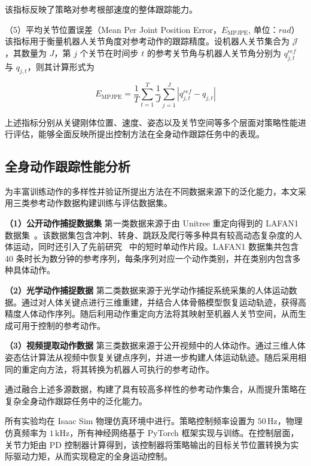 该指标反映了策略对参考根部速度的整体跟踪能力。

（5）平均关节位置误差（Mean Per Joint Position Error，$E_{\mathrm{MPJPE}}$, 单位：$rad$）  
该指标用于衡量机器人关节角度对参考动作的跟踪精度。设机器人关节集合为 $\mathcal{J}$，其数量为 $J$，第 $j$ 个关节在时间步 $t$ 的参考关节角与机器人关节角分别为 $q^{ref}_{j,t}$ 与 $q_{j,t}$，则其计算形式为

\begin{equation}
	E_{\mathrm{MPJPE}} =
	\frac{1}{T}
	\sum_{t=1}^{T}
	\frac{1}{J}
	\sum_{j=1}^{J}
	\left|
	q^{ref}_{j,t}
	-
	q_{j,t}
	\right|
\end{equation}

上述指标分别从关键刚体位置、速度、姿态以及关节空间等多个层面对策略性能进行评估，能够全面反映所提出控制方法在全身动作跟踪任务中的表现。

\subsection{全身动作跟踪性能分析}
为丰富训练动作的多样性并验证所提出方法在不同数据来源下的泛化能力，本文采用三类参考动作数据构建训练与评估数据集。

\textbf{（1）公开动作捕捉数据集}  
第一类数据来源于由 Unitree 重定向得到的 LAFAN1 数据集~\cite{harvey2020robust}。该数据集包含冲刺、转身、跳跃及爬行等多种具有较高动态复杂度的人体运动，同时还引入了先前研究~\cite{zhang2025hub,he2025asap} 中的短时单动作片段。LAFAN1 数据集共包含 40 条时长为数分钟的参考序列，每条序列对应一个动作类别，并在类别内包含多种具体动作。

\textbf{（2）光学动作捕捉数据}  
第二类数据来源于光学动作捕捉系统采集的人体运动数据。通过对人体关键点进行三维重建，并结合人体骨骼模型恢复运动轨迹，获得高精度人体动作序列。随后利用动作重定向方法将其映射至机器人关节空间，从而生成可用于控制的参考动作。

\textbf{（3）视频提取动作数据}  
第三类数据来源于公开视频中的人体动作。通过三维人体姿态估计算法从视频中恢复关键点序列，并进一步构建人体运动轨迹。随后采用相同的重定向方法，将其转换为机器人可执行的参考动作。

通过融合上述多源数据，构建了具有较高多样性的参考动作集合，从而提升策略在复杂全身动作跟踪任务中的泛化能力。

所有实验均在 Isaac Sim 物理仿真环境中进行。策略控制频率设置为 $50\,\mathrm{Hz}$，物理仿真频率为 $1\,\mathrm{kHz}$，所有神经网络基于 PyTorch 框架实现与训练。在控制层面，关节力矩由 PD 控制器计算得到，该控制器将策略输出的目标关节位置转换为实际驱动力矩，从而实现稳定的全身运动控制。

